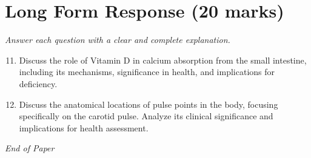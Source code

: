 \documentclass[12pt]{article}
\begin{document}
\section*{Long Form Response (20 marks)}
\textit{Answer each question with a clear and complete explanation.}
\begin{enumerate}[label=\arabic*.]
\setcounter{enumi}{10}
\item Discuss the role of Vitamin D in calcium absorption from the small intestine, including its mechanisms, significance in health, and implications for deficiency.
\item Discuss the anatomical locations of pulse points in the body, focusing specifically on the carotid pulse. Analyze its clinical significance and implications for health assessment.
\end{enumerate}

\vfill
\noindent\textit{End of Paper}
\end{document}

